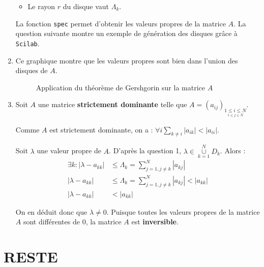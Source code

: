 \documentclass[a4paper,11pt]{article}
\theoremstyle{nonumberplain}
\theoremstyle{nonumberplain}
\theoremstyle{nonumberplain}
\begin{document}
\begin{enumerate}
\begin{itemize}
            \item
            Le rayon $r$ du disque vaut $\Lambda_{k}$.
        \end{itemize}

        La fonction \texttt{spec} permet d'obtenir les valeurs propres de la matrice $A$.
        La question suivante montre un exemple de génération des disques grâce à \texttt{Scilab}.

        \item
        Ce graphique montre que les valeurs propres sont bien dans l'union des disques de $A$.
        \begin{figure}[H]
            \centering
            \caption{\label{graph_exo7} Application du théorème de Gershgorin sur la matrice $A$}
        \end{figure}

        \item
        Soit $A$ une matrice \textbf{strictement dominante} telle que $A = (a_{ij})_{\underset {1 \leq j \leq N}{1 \leq i \leq N}}$.

        Comme $A$ est strictement dominante, on a : $\forall i \sum\limits_{k \ne i}^{} |a_{ik}| < |a_{ii}|$.

        Soit $\lambda$ une valeur propre de $A$. D'après la question 1, $\lambda \in \underset{k = 1}{\overset{N}{\cup}} D_{k}$. Alors :
        \begin{equation*}
            \begin{split}
                \exists k : |\lambda - a_{kk}| & \leq \Lambda_{k} = \sum\limits_{j=1, j\ne k}^{N} |a_{kj}| \\
                            |\lambda - a_{kk}| & \leq \Lambda_{k} = \sum\limits_{j=1, j\ne k}^{N} |a_{kj}| < |a_{kk}| \\
                            |\lambda - a_{kk}| & < |a_{kk}|
            \end{split}
        \end{equation*}

        On en déduit donc que $\lambda \ne 0$. Puisque toutes les valeurs propres de la matrice $A$ sont différentes de $0$, la matrice $A$ est \textbf{inversible}.
    \end{enumerate}

    \section{RESTE}
\end{document}
